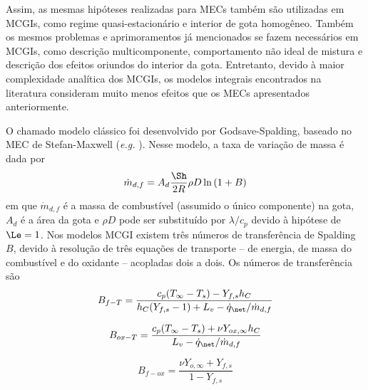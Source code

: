 Assim, as mesmas hipóteses realizadas para MECs também são utilizadas em MCGIs, como regime quasi-estacionário e interior de gota homogêneo.
Também os mesmos problemas e aprimoramentos já mencionados se fazem necessários em MCGIs, como descrição multicomponente, comportamento não ideal de mistura e  
descrição dos efeitos oriundos do interior da gota.
Entretanto, devido à maior complexidade analítica dos MCGIs, os modelos integrais encontrados na literatura consideram muito menos efeitos que os MECs apresentados anteriormente.

O chamado modelo clássico foi desenvolvido por Godsave-Spalding, baseado no MEC de Stefan-Maxwell (\emph{e.g.} \cite{Glassman2008,Law2006,Turns2000}).
Nesse modelo, a taxa de variação de massa é dada por
\begin{equation}
    \dot m_{d,f} = A_d \frac{\Sh}{2R} \rho D \ln{(1 + B)} \label{eq:m_evap_B_M_2}
\end{equation}
em que $\dot m_{d,f}$ é a massa de combustível (assumido o único componente) na gota, $A_d$ é a área da gota e $\rho D$ pode ser substituído por $\lambda/c_p$ devido à hipótese de $\Le=1$.
Nos modelos MCGI existem três números de transferência de Spalding $B$, devido à resolução de três equações de transporte -- de energia, de massa do combustível e do oxidante -- acopladas dois a dois.
Os números de transferência são
\vspace{-6pt}
\begin{align}
    B_{f-T}  = \frac{c_p(T_\infty - T_s) - Y_{f,s} h_C}{h_C(Y_{f,s} - 1) + L_v - \dot q_{\net}/\dot m_{d,f}} \label{eq:B_fq}
\end{align}
\vspace{-6pt}

\begin{minipage}{0.5\linewidth}
    \begin{equation}
        B_{ox-T} = \frac{c_p(T_\infty - T_s) + \nu Y_{ox,\infty}h_C}{L_v  - \dot q_{\net}/\dot m_{d,f}} \label{eq:B_oq}\\
    \end{equation}
\end{minipage}
\hspace{0.05\textwidth}
\begin{minipage}{0.4\linewidth}
    \begin{equation}
        B_{f-ox} = \frac{\nu Y_{o,\infty} + Y_{f,s}}{1 - Y_{f,s}} \label{eq:B_fo}
    \end{equation}
\end{minipage}
\vspace{0pt}

